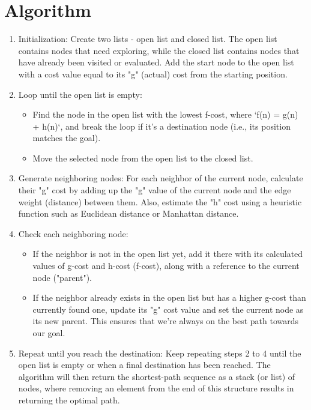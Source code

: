 \documentclass[12pt]{fphw}
\begin{document}
\section{Algorithm}
\begin{enumerate}
  \item Initialization: Create two lists - open list and closed list. The open list contains nodes that 
    need exploring, while the closed list contains nodes that have already been visited or evaluated. 
    Add the start node to the open list with a cost value equal to its "g" (actual) cost from the 
    starting position. 
  \item Loop until the open list is empty: 
    \begin{itemize}
      \item Find the node in the open list with the lowest f-cost, where `f(n) = g(n) + h(n)`, and break 
        the loop if it's a destination node (i.e., its position matches the goal).
      \item Move the selected node from the open list to the closed list.
    \end{itemize}
  \item Generate neighboring nodes: For each neighbor of the current node, calculate their "g" cost by 
    adding up the "g" value of the current node and the edge weight (distance) between them. Also, 
    estimate the "h" cost using a heuristic function such as Euclidean distance or Manhattan distance. 
  \item Check each neighboring node: 
    \begin{itemize}
      \item If the neighbor is not in the open list yet, add it there with its calculated values of g-cost 
        and h-cost (f-cost), along with a reference to the current node ("parent"). 
      \item If the neighbor already exists in the open list but has a higher g-cost than currently found 
        one, update its "g" cost value and set the current node as its new parent. This ensures that we're 
        always on the best path towards our goal. 
    \end{itemize}
  \item Repeat until you reach the destination: Keep repeating steps 2 to 4 until the open list is empty 
    or when a final destination has been reached. The algorithm will then return the shortest-path 
    sequence as a stack (or list) of nodes, where removing an element from the end of this structure 
    results in returning the optimal path.

\end{enumerate}
\end{document}
